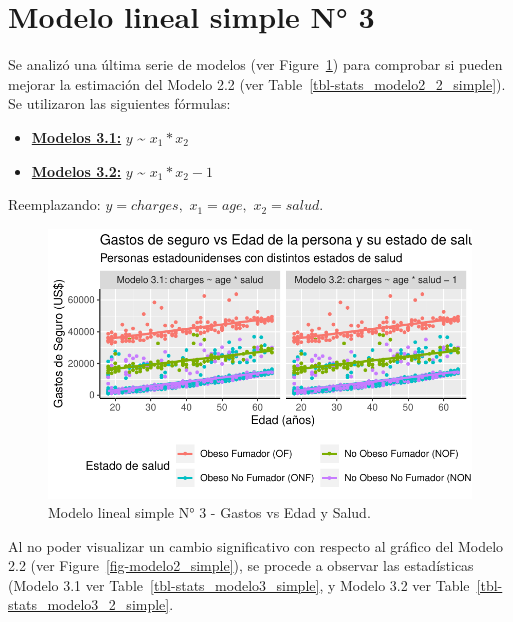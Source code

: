 \documentclass[
  letterpaper,
]{book}
\begin{document}
\hypertarget{modelo-lineal-simple-n-3}{%
\section*{Modelo lineal simple N° 3}\label{modelo-lineal-simple-n-3}}

Se analizó una última serie de modelos (ver
Figure~\ref{fig-modelo3_simple}) para comprobar si pueden mejorar la
estimación del Modelo 2.2 (ver Table~\ref{tbl-stats_modelo2_2_simple}).
Se utilizaron las siguientes fórmulas:

\begin{itemize}
\item
  \uline{\textbf{Modelos 3.1:}} \(y\) \textasciitilde{} \(x_1 * x_2\)
\item
  \uline{\textbf{Modelos 3.2:}} \(y\) \textasciitilde{}
  \(x_1 * x_2 - 1\)
\end{itemize}

Reemplazando: \(y = charges,\) \(x_1 = age,\) \(x_2 = salud\).

\begin{figure}

{\centering \includegraphics{./index_files/figure-pdf/fig-modelo3_simple-1.pdf}

}

\caption{\label{fig-modelo3_simple}Modelo lineal simple N° 3 - Gastos vs
Edad y Salud.}

\end{figure}

Al no poder visualizar un cambio significativo con respecto al gráfico
del Modelo 2.2 (ver Figure~\ref{fig-modelo2_simple}), se procede a
observar las estadísticas (Modelo 3.1 ver
Table~\ref{tbl-stats_modelo3_simple}, y Modelo 3.2 ver
Table~\ref{tbl-stats_modelo3_2_simple}.
\end{document}
